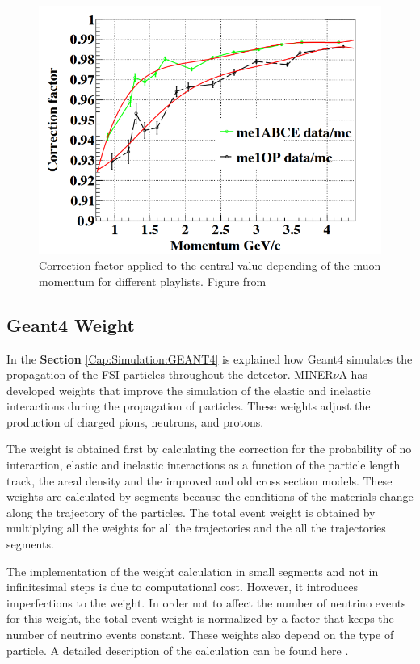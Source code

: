 \begin{figure}
    \centering
    \includegraphics[scale=0.4]{Figures/Chapter3/MINOSEfficiencyWeight.png}
    \caption{Correction factor applied to the central value depending of the muon momentum for different playlists. Figure from \cite{MINOSEffWeight}}
    \label{fig:Chapter3:MINOSEfficiencyWeight}
\end{figure}

\subsection{Geant4 Weight}
\label{Cap:Simulation:MnvGENIETunes:Geant4Weight}
In the \textbf{Section} \ref{Cap:Simulation:GEANT4} is explained how Geant4 simulates the propagation of the FSI particles throughout the detector. MINER$\nu$A has developed weights that improve the simulation of the elastic and inelastic interactions during the propagation of particles. These weights adjust the production of charged pions, neutrons, and protons. 

The weight is obtained first by calculating the correction for the probability of no interaction, elastic and inelastic interactions as a function of the particle length track, the areal density and the improved and old cross section models. These weights are calculated by segments because the conditions of the materials change along the trajectory of the particles. The total event weight is obtained by multiplying all the weights for all the trajectories and the all the trajectories segments.  

The implementation of the weight calculation in small segments and not in infinitesimal steps is due to computational cost. However, it introduces imperfections to the weight. In order not to affect the number of neutrino events for this weight, the total event weight is normalized by a factor that keeps the number of neutrino events constant. These weights also depend on the type of particle. A detailed description of the calculation can be found here \cite{JeffreeThesis}.

